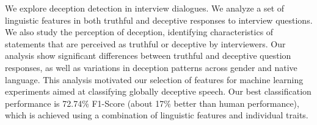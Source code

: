 We explore deception detection in interview dialogues. We analyze a set of linguistic features in both truthful and deceptive responses to interview questions. We also study the perception of deception, identifying characteristics of statements that are perceived as truthful or deceptive by interviewers. Our analysis show significant differences between truthful and deceptive question responses, as well as variations in deception patterns across gender and native language. This analysis motivated our selection of features for machine learning experiments aimed at classifying globally deceptive speech. Our best classification performance is 72.74\% F1-Score (about 17\% better than human performance), which is achieved using a combination of linguistic features and individual traits.
